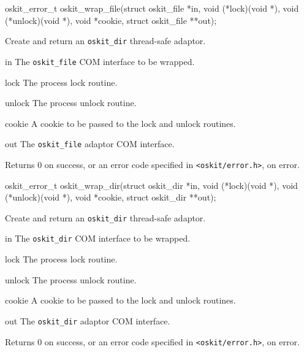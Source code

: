 \begin{apisyn}

	\funcproto oskit_error_t
	oskit_wrap_file(struct oskit_file *in, 
		void (*lock)(void *), 
		void (*unlock)(void *),
		void *cookie,
		struct oskit_file **out);
\end{apisyn}
\begin{apidesc}
	Create and return an {\tt oskit_dir} thread-safe adaptor.
\end{apidesc}
\begin{apiparm}
	\item[in]
		The {\tt oskit_file} COM interface to be wrapped.
	\item[lock]
		The process lock routine.
	\item[unlock]
		The process unlock routine.
	\item[cookie]
		A cookie to be passed to the lock and unlock routines.
	\item[out]
		The {\tt oskit_file} adaptor COM interface.
\end{apiparm}
\begin{apiret}
	Returns 0 on success, or an error code specified in
	{\tt <oskit/error.h>}, on error.
\end{apiret}


\begin{apisyn}

	\funcproto oskit_error_t
	oskit_wrap_dir(struct oskit_dir *in, 
		void (*lock)(void *), 
		void (*unlock)(void *),
		void *cookie,
		struct oskit_dir **out);
\end{apisyn}
\begin{apidesc}
	Create and return an {\tt oskit_dir} thread-safe adaptor.
\end{apidesc}
\begin{apiparm}
	\item[in]
		The {\tt oskit_dir} COM interface to be wrapped.
	\item[lock]
		The process lock routine.
	\item[unlock]
		The process unlock routine.
	\item[cookie]
		A cookie to be passed to the lock and unlock routines.
	\item[out]
		The {\tt oskit_dir} adaptor COM interface.
\end{apiparm}
\begin{apiret}
	Returns 0 on success, or an error code specified in
	{\tt <oskit/error.h>}, on error.
\end{apiret}


